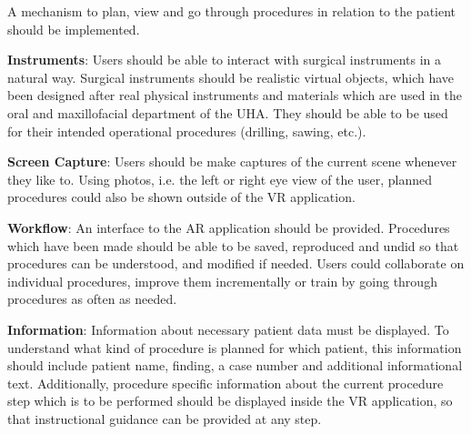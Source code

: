 \begin{compactenum}[label=(\textbf{\alph*})]
\begin{compactenum}[label=(\textbf{\alph*})]
        \item \label{req::F3.7}A mechanism to plan, view and go through procedures in relation to the patient should be implemented.  
    \end{compactenum}
    \item \label{req::F4}\textbf{Instruments}: Users should be able to interact with surgical instruments in a natural way.
    Surgical instruments should be realistic virtual objects, which have been designed after real physical instruments and materials which are used in the oral and maxillofacial department of the UHA.
    They should be able to be used for their intended operational procedures (drilling, sawing, etc.).
    \item \label{req::F5}\textbf{Screen Capture}: Users should be make captures of the current scene whenever they like to.
    Using photos, i.e. the left or right eye view of the user, planned procedures could also be shown outside of the VR application. 
    \item \label{req::F6}\textbf{Workflow}: An interface to the AR application should be provided.
    Procedures which have been made should be able to be saved, reproduced and undid so that procedures can be understood, and modified if needed.
    Users could collaborate on individual procedures, improve them incrementally or train by going through procedures as often as needed.
    \item \label{req::F7}\textbf{Information}: Information about necessary patient data must be displayed.
    To understand what kind of procedure is planned for which patient, this information should include patient name, finding, a case number and additional informational text.
    Additionally, procedure specific information about the current procedure step which is to be performed should be displayed inside the VR application, so that instructional guidance can be provided at any step.
\end{compactenum}